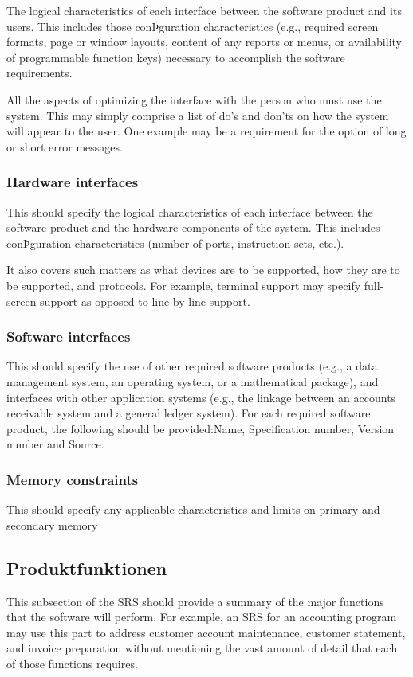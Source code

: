 			The logical characteristics of each interface between the software product and its users. This includes those conÞguration characteristics (e.g., required screen formats, page or window layouts, content of any reports or menus, or availability of programmable function keys) necessary to accomplish the software requirements.
			
			All the aspects of optimizing the interface with the person who must use the system. This may simply comprise a list of do's and don'ts on how the system will appear to the user. One example may be a requirement for the option of long or short error messages.
		
		\subsubsection{Hardware interfaces}
			This should specify the logical characteristics of each interface between the software product and the hardware components of the system. This includes conÞguration characteristics (number of ports, instruction sets, etc.).
			
			It also covers such matters as what devices are to be supported, how they are to be supported, and protocols. For example, terminal support may specify full-screen support as opposed to line-by-line support.
		
		\subsubsection{Software interfaces}
			This should specify the use of other required software products (e.g., a data management system, an operating system, or a mathematical package), and interfaces with other application systems (e.g., the linkage between an accounts receivable system and a general ledger system). For each required software product, the following should be provided:Name, Specification number, Version number and Source.
		
		\subsubsection{Memory constraints}
			This should specify any applicable characteristics and limits on primary and secondary memory
		
	\subsection{Produktfunktionen}
		This subsection of the SRS should provide a summary of the major functions that the software will perform. For example, an SRS for an accounting program may use this part to address customer account maintenance, customer statement, and invoice preparation without mentioning the vast amount of detail that each of those functions requires.
		
